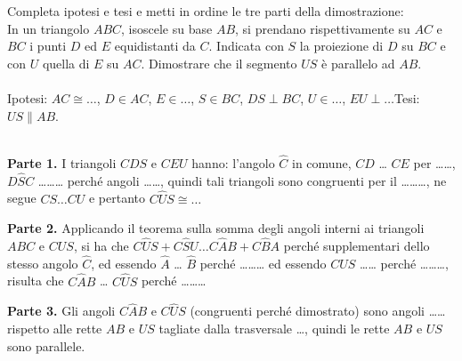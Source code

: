 \begin{esercizio}
\label{ese:3.20}
Completa ipotesi e tesi e metti in ordine le tre parti della dimostrazione:\\
In un triangolo $ABC$, isoscele su base $AB$, si prendano rispettivamente su $AC$ e $BC$ i punti $D$ ed $E$ equidistanti da $C$. Indicata con $S$ la proiezione di $D$ su $BC$ e con $U$ quella di $E$ su $AC$. Dimostrare che il segmento $US$ è parallelo ad $AB$.\\
~\\
\noindent Ipotesi: $AC\cong \ldots$, $D\in AC$, $E\in \ldots$, $S\in BC$, $DS\perp BC$, $U\in \ldots$, $EU\perp \ldots$\hfill Tesi: $US\parallel AB$.\\
~\\
\noindent\begin{minipage}{.75\textwidth}
\textbf{Parte 1.} I triangoli $CDS$ e $CEU$  hanno: l'angolo $\widehat{C}$ in comune, $CD$ \ldots{} $CE$ per \ldots\ldots{}, $D\widehat{S}C$ \ldots\ldots\ldots{} perché angoli \ldots\ldots{}, quindi tali triangoli sono congruenti per il \ldots\ldots\ldots{}, ne segue $CS \ldots CU$ e pertanto $C\widehat{U}S\cong \ldots$\par

\textbf{Parte 2.} Applicando il teorema sulla somma degli angoli interni ai triangoli $ABC$ e $CUS$, si ha che $C\widehat{U}S + C\widehat{S}U \ldots{} C\widehat{A}B + C\widehat{B}A$ perché supplementari dello stesso angolo $\widehat{C}$, ed essendo $\widehat{A}$ \dots{} $\widehat{B}$ perché \ldots\ldots\ldots{} ed essendo $C\widehat{U}S$ \ldots\ldots{} perché \ldots\ldots\ldots{}, risulta che $C\widehat{A}B$ \ldots{} $C\widehat{U}S$ perché \ldots\ldots\ldots{}\par

\textbf{Parte 3.} Gli angoli $C\widehat{A}B$ e $C\widehat{U}S$ (congruenti perché dimostrato) sono angoli \ldots\ldots rispetto alle rette $AB$ e $US$ tagliate dalla trasversale \ldots, quindi le rette $AB$ e $US$ sono parallele.
\end{minipage}\hfil
\begin{minipage}{.25\textwidth}
\centering
\end{minipage}
\end{esercizio}

